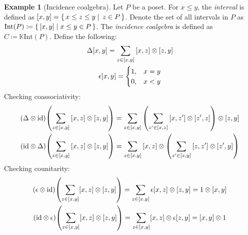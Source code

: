 \documentclass[svgnames]{article}
\theoremstyle{definition}
\newtheorem{Example}{Example}
\theoremstyle{remark}
\theoremstyle{underline}
\theoremstyle{underline}
\newcommand{\id}{\mathrm{id}}
\begin{document}
	\begin{Example}[Incidence coalgebra]
		Let $P$ be a poset. For $x \leq y$, the \emph{interval} is defined as $\bqty{x,y} = \qty{\, x \leq z \leq y \mid \, z \in P \,}$. Denote the set of all intervals in $P$ as $\mathrm{Int}(P) \coloneqq \qty{\, \bqty{x,y} \mid x \leq y \in P \,}$. The \emph{incidence coalgebra} is defined as $C \coloneqq \mathbb K \mathrm{Int}(P)$. Define the following:
		\begin{gather*}
			\Delta\bqty{x,y} = \sum_{z \in [x, y]} \bqty{x,z} \otimes \bqty{z,y} \\
			\epsilon{\bqty{x,y}} =
			\begin{cases}
				1, & x = y \\
				0, & x < y
			\end{cases}
		\end{gather*}
		Checking coassociativity:
		\begin{gather*}
			\pqty{\Delta \otimes \id}\pqty{\sum_{z \in [x, y]} \bqty{x,z} \otimes \bqty{z,y}} = \sum_{z \in [x, y]}\pqty{\sum_{z' \in [x, z]} \bqty{x,z'} \otimes \bqty{z',z}} \otimes \bqty{z,y} \\
			\pqty{\id \otimes \Delta}\pqty{\sum_{z \in [x, y]} \bqty{x,z} \otimes \bqty{z,y}} = \sum_{z \in [x, y]} \bqty{x,z} \otimes \pqty{\sum_{z' \in [z, y]} \bqty{z,z'} \otimes \bqty{z',y}}
		\end{gather*}
		Checking counitarity:
		\begin{gather*}
		\pqty{\epsilon \otimes \id} \pqty{\sum_{z \in [x, y]} [x, z] \otimes [z, y]} = \sum_{z \in [x, y]} \epsilon [x, z] \otimes [z, y] = 1 \otimes [x, y]\\
		\pqty{\id \otimes \epsilon} \pqty{\sum_{z \in [x, y]} [x, z] \otimes [z, y]} = \sum_{z \in [x, y]} [x, z] \otimes \epsilon [z, y] = [x, y] \otimes 1
		\end{gather*}
	\end{Example}
\end{document}
